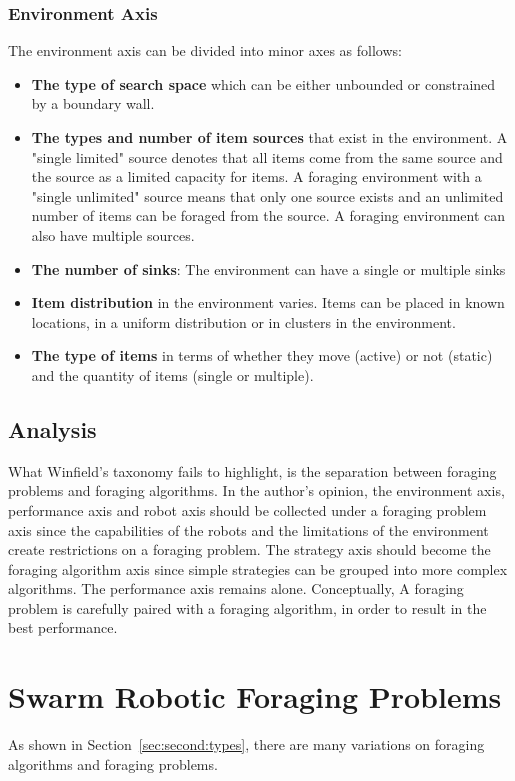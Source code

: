 \subsubsection{Environment Axis}
The environment axis can be divided into minor axes as follows:
\begin{itemize}
\item \textbf{The type of search space} which can be either unbounded or constrained by a boundary wall.
\item \textbf{The types and number of item sources} that exist in the environment. A "single limited" source denotes that all items come from the same source and the source as a limited capacity for items. A foraging environment with a "single unlimited" source means that only one source exists and an unlimited number of items can be foraged from the source. A foraging environment can also have multiple sources.
\item \textbf{The number of sinks}: The environment can have a single or multiple sinks
\item \textbf{Item distribution} in the environment varies. Items can be placed in known locations, in a uniform distribution or in clusters in the environment.
\item \textbf{The type of items} in terms of whether they move (active) or not (static) and the quantity of items (single or multiple). 
\end{itemize}

\subsection{Analysis}
What Winfield's taxonomy fails to highlight, is the separation between foraging problems and foraging algorithms. In the author's opinion, the environment axis, performance axis and robot axis should be collected under a foraging problem axis since the capabilities of the robots and the limitations of the environment create restrictions on a foraging problem. The strategy axis should become the foraging algorithm axis since simple strategies can be grouped into more complex algorithms. The performance axis remains alone. Conceptually, A foraging problem is carefully paired with a foraging algorithm,  in order to result in the best performance.

\section{Swarm Robotic Foraging Problems}
As shown in Section~\ref{sec:second:types}, there are many variations on foraging algorithms and foraging problems. 
